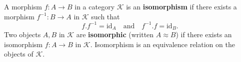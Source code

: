 A morphism $f: A \longrightarrow B$ in a category $\mathcal{K}$ is an \textbf{isomorphism} if there exists a morphism $f^{-1}: B \longrightarrow A$ in $\mathcal{K}$ such that
$$f.f^{-1} = \mathrm{id}_A \quad \text{and} \quad f^{-1}.f = \mathrm{id}_B.$$
Two objects $A, B$ in $\mathcal{K}$ are \textbf{isomorphic} (written $A \approx B$) if there exists an isomorphism $f: A \longrightarrow B$ in $\mathcal{K}$. Isomorphism is an equivalence relation on the objects of $\mathcal{K}$.
